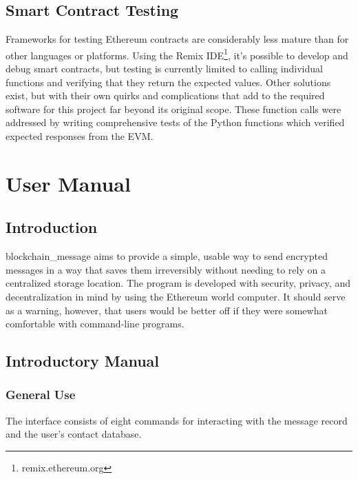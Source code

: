 \documentclass[titlepage]{report}
\begin{document}
\section{Smart Contract Testing}
Frameworks for testing \gls{Ethereum} contracts are considerably less mature than for other languages or platforms. Using the Remix IDE\footnote{remix.ethereum.org}, it's possible to develop and debug \glspl{smart contract}, but testing is currently limited to calling individual functions and verifying that they return the expected values. Other solutions exist, but with their own quirks and complications that add to the required software for this project far beyond its original scope. These function calls were addressed by writing comprehensive tests of the Python functions which verified expected responses from the EVM.

\chapter{User Manual}
\section{Introduction}
blockchain\_message aims to provide a simple, usable way to send encrypted messages in a way that saves them irreversibly without needing to rely on a centralized storage location. The program is developed with security, privacy, and decentralization in mind by using the \gls{Ethereum} world computer. It should serve as a warning, however, that users would be better off if they were somewhat comfortable with \gls{command-line} programs.

\section{Introductory Manual}
\subsection{General Use}
The interface consists of eight commands for interacting with the message record and the user's contact database.\\
\end{document}
